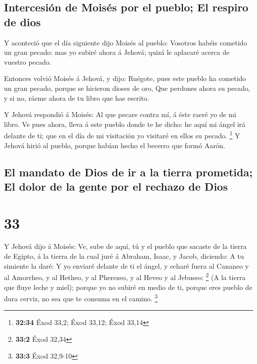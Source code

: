\hypertarget{intercesiuxf3n-de-moisuxe9s-por-el-pueblo-el-respiro-de-dios}{%
\subsection{Intercesión de Moisés por el pueblo; El respiro de
dios}\label{intercesiuxf3n-de-moisuxe9s-por-el-pueblo-el-respiro-de-dios}}

 Y aconteció que el día siguiente dijo Moisés al pueblo:
Vosotros habéis cometido un gran pecado: mas yo subiré ahora á Jehová;
quizá le aplacaré acerca de vuestro pecado.

 Entonces volvió Moisés á Jehová, y dijo: Ruégote, pues
este pueblo ha cometido un gran pecado, porque se hicieron dioses de
oro,  Que perdones ahora su pecado, y si no, ráeme ahora
de tu libro que has escrito.

 Y Jehová respondió á Moisés: Al que pecare contra mí, á
éste raeré yo de mi libro.  Ve pues ahora, lleva á este
pueblo donde te he dicho: he aquí mi ángel irá delante de ti; que en el
día de mi visitación yo visitaré en ellos su pecado. \footnote{\textbf{32:34}
  Éxod 33,2; Éxod 33,12; Éxod 33,14}  Y Jehová hirió al
pueblo, porque habían hecho el becerro que formó Aarón.

\hypertarget{el-mandato-de-dios-de-ir-a-la-tierra-prometida-el-dolor-de-la-gente-por-el-rechazo-de-dios}{%
\subsection{El mandato de Dios de ir a la tierra prometida; El dolor de
la gente por el rechazo de
Dios}\label{el-mandato-de-dios-de-ir-a-la-tierra-prometida-el-dolor-de-la-gente-por-el-rechazo-de-dios}}

\hypertarget{section-32}{%
\section{33}\label{section-32}}

 Y Jehová dijo á Moisés: Ve, sube de aquí, tú y el pueblo
que sacaste de la tierra de Egipto, á la tierra de la cual juré á
Abraham, Isaac, y Jacob, diciendo: A tu simiente la daré: 
Y yo enviaré delante de ti el ángel, y echaré fuera al Cananeo y al
Amorrheo, y al Hetheo, y al Pherezeo, y al Heveo y al Jebuseo:
\footnote{\textbf{33:2} Éxod 32,34}  (A la tierra que
fluye leche y miel); porque yo no subiré en medio de ti, porque eres
pueblo de dura cerviz, no sea que te consuma en el camino. \footnote{\textbf{33:3}
  Éxod 32,9-10}

